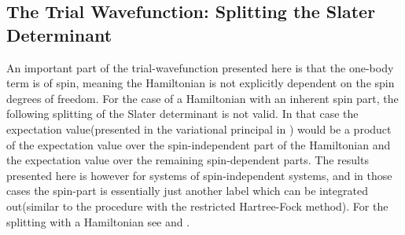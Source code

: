     \subsection{The Trial Wavefunction: Splitting the Slater Determinant}
        An important part of the trial-wavefunction presented here is that the
        one-body term is  of spin, meaning the Hamiltonian
        is not explicitly dependent on the spin degrees of freedom. For the
        case of a Hamiltonian with an inherent spin part, the following
        splitting of the Slater determinant is not valid. In that case the
        expectation value(presented in the variational principal in
        ) would be a product of the expectation value over the
        spin-independent part of the Hamiltonian and the expectation value over
        the remaining spin-dependent parts\cite{spinDep}. The results presented
        here is however for systems of spin-independent systems, and in those
        cases the spin-part is essentially just another label which can be
        integrated out(similar to the procedure with the restricted
        Hartree-Fock method). For the splitting with a 
        Hamiltonian see \cite{splitDet} and \cite{basicMB}. \\
        
